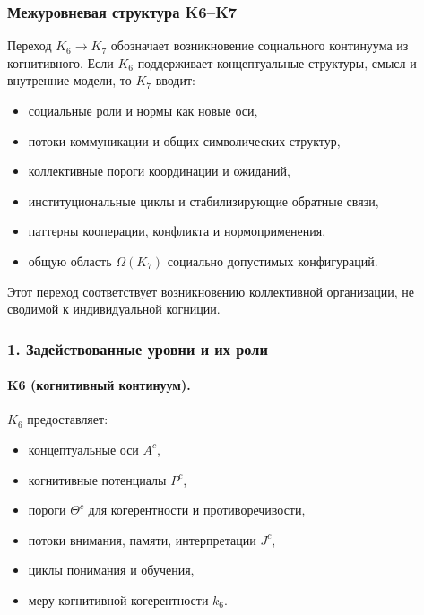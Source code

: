
\subsubsection{Межуровневая структура K6–K7}
\label{sec:crossk-k6-k7}

Переход $K_6 \rightarrow K_7$ обозначает возникновение социального
континуума из когнитивного. Если $K_6$ поддерживает концептуальные структуры,
смысл и внутренние модели, то $K_7$ вводит:
\begin{itemize}
  \item социальные роли и нормы как новые оси,
  \item потоки коммуникации и общих символических структур,
  \item коллективные пороги координации и ожиданий,
  \item институциональные циклы и стабилизирующие обратные связи,
  \item паттерны кооперации, конфликта и нормоприменения,
  \item общую область $\Omega(K_7)$ социально допустимых конфигураций.
\end{itemize}

Этот переход соответствует возникновению коллективной организации,
не сводимой к индивидуальной когниции.

\subsubsection{1. Задействованные уровни и их роли}

\paragraph{K6 (когнитивный континуум).}
$K_6$ предоставляет:
\begin{itemize}
  \item концептуальные оси $A^{c}$,
  \item когнитивные потенциалы $P^{c}$,
  \item пороги $\Theta^{c}$ для когерентности и противоречивости,
  \item потоки внимания, памяти, интерпретации $J^{c}$,
  \item циклы понимания и обучения,
  \item меру когнитивной когерентности $k_6$.
\end{itemize}

